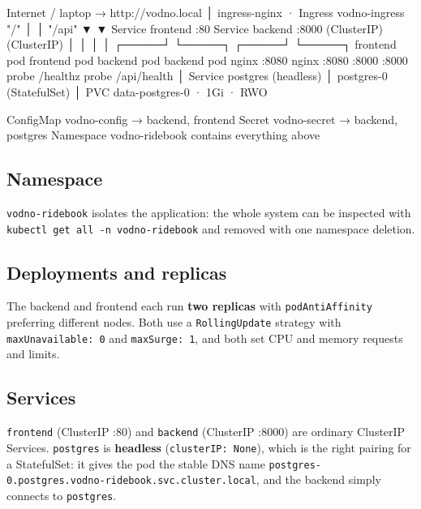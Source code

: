 \documentclass[10pt,a4paper]{article}
\newcommand{\cd}[1]{\texttt{\small #1}}
\begin{document}
\begin{code}
                    Internet / laptop  →  http://vodno.local
                                  │
                      ingress-nginx  ·  Ingress vodno-ingress
                     "/" │                          │ "/api"
                         ▼                          ▼
              Service frontend :80         Service backend :8000
                 (ClusterIP)                    (ClusterIP)
                    │      │                     │      │
              ┌─────┘      └─────┐         ┌─────┘      └─────┐
           frontend pod    frontend pod  backend pod    backend pod
           nginx :8080     nginx :8080     :8000          :8000
           probe /healthz                  probe /api/health
                                                 │
                                    Service postgres (headless)
                                                 │
                                     postgres-0  (StatefulSet)
                                                 │
                                  PVC data-postgres-0 · 1Gi · RWO

   ConfigMap vodno-config → backend, frontend
   Secret    vodno-secret → backend, postgres
   Namespace vodno-ridebook contains everything above
\end{code}

\subsection{Namespace}

\cd{vodno-ridebook} isolates the application: the whole system can be
inspected with \cd{kubectl get all -n vodno-ridebook} and removed with one
namespace deletion.

\subsection{Deployments and replicas}

The backend and frontend each run \textbf{two replicas} with
\cd{podAntiAffinity} preferring different nodes. Both use a
\cd{RollingUpdate} strategy with \cd{maxUnavailable: 0} and \cd{maxSurge: 1},
and both set CPU and memory requests and limits.

\subsection{Services}

\cd{frontend} (ClusterIP :80) and \cd{backend} (ClusterIP :8000) are ordinary
ClusterIP Services. \cd{postgres} is \textbf{headless}
(\cd{clusterIP: None}), which is the right pairing for a StatefulSet: it gives
the pod the stable DNS name
\cd{postgres-0.postgres.vodno-ridebook.svc.cluster.local}, and the backend
simply connects to \cd{postgres}.
\end{document}
